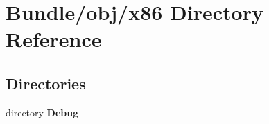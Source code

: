 \section{Bundle/obj/x86 Directory Reference}
\label{dir_5d43875e4bdcf5d0ace7b54e17c3318a}
\subsection*{Directories}
\begin{DoxyCompactItemize}
\item 
directory {\bf Debug}
\end{DoxyCompactItemize}
